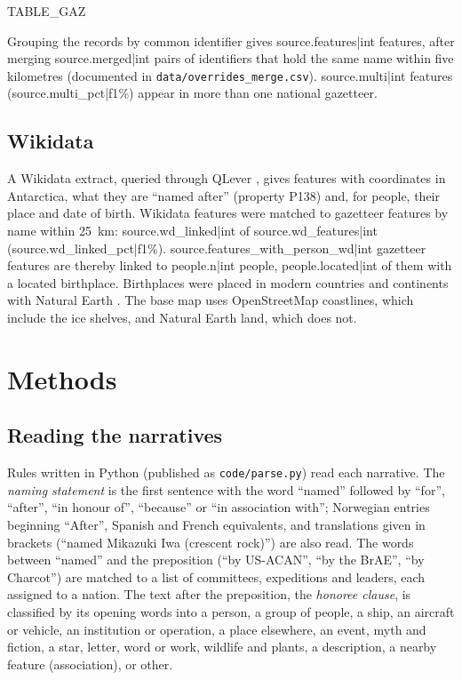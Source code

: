 \documentclass[11pt,a4paper]{article}
\begin{document}
{{TABLE_GAZ}}

Grouping the records by common identifier gives {{source.features|int}} features, after merging {{source.merged|int}} pairs of identifiers that hold the same name within five kilometres (documented in \texttt{data/overrides\_merge.csv}). {{source.multi|int}} features ({{source.multi_pct|f1}}\%) appear in more than one national gazetteer.

\subsection{Wikidata}
A Wikidata \citep{wikidata} extract, queried through QLever \citep{qlever}, gives features with coordinates in Antarctica, what they are ``named after'' (property P138) and, for people, their place and date of birth. Wikidata features were matched to gazetteer features by name within 25~km: {{source.wd_linked|int}} of {{source.wd_features|int}} ({{source.wd_linked_pct|f1}}\%). {{source.features_with_person_wd|int}} gazetteer features are thereby linked to {{people.n|int}} people, {{people.located|int}} of them with a located birthplace. Birthplaces were placed in modern countries and continents with Natural Earth \citep{naturalearth}. The base map uses OpenStreetMap \citep{osm} coastlines, which include the ice shelves, and Natural Earth land, which does not.

\section{Methods}
\subsection{Reading the narratives}
Rules written in Python (published as \texttt{code/parse.py}) read each narrative. The \emph{naming statement} is the first sentence with the word ``named'' followed by ``for'', ``after'', ``in honour of'', ``because'' or ``in association with''; Norwegian entries beginning ``After'', Spanish and French equivalents, and translations given in brackets (``named Mikazuki Iwa (crescent rock)'') are also read. The words between ``named'' and the preposition (``by US-ACAN'', ``by the BrAE'', ``by Charcot'') are matched to a list of committees, expeditions and leaders, each assigned to a nation. The text after the preposition, the \emph{honoree clause}, is classified by its opening words into a person, a group of people, a ship, an aircraft or vehicle, an institution or operation, a place elsewhere, an event, myth and fiction, a star, letter, word or work, wildlife and plants, a description, a nearby feature (association), or other.
\end{document}
